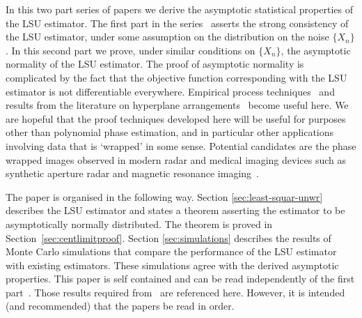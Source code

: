 \documentclass[journal]{IEEEtran}
\begin{document}
In this two part series of papers we derive the asymptotic statistical properties of the LSU estimator.  The first part in the series~\cite{McKilliam_pps1_2012} asserts the strong consistency of the LSU estimator, under some assumption on the distribution on the noise $\{X_n\}$.  In this second part we prove, under similar conditions on $\{X_n\}$, the asymptotic normality of the LSU estimator.  The proof of asymptotic normality is complicated by the fact that the objective function corresponding with the LSU estimator is not differentiable everywhere.  Empirical process techniques~\cite{Pollard_new_ways_clts_1986,Pollard_asymp_empi_proc_1989,van2009empirical,Dudley_unif_central_lim_th_1999} and results from the literature on hyperplane arrangements~\cite{Chazelle_discrepency_method_2000,Matousek_lect_disc_geom_2002} become useful here.  We are hopeful that the proof techniques developed here will be useful for purposes other than polynomial phase estimation, and in particular other applications involving data that is `wrapped' in some sense.  Potential candidates are the phase wrapped images observed in modern radar and medical imaging devices such as synthetic aperture radar and magnetic resonance imaging~\cite{Nico_phaseunwrappingSAR_2000,Friedlander_PD_phaseunwrapping_1996}.

The paper is organised in the following way.  Section \ref{sec:least-squar-unwr} describes the LSU estimator and states a theorem asserting the estimator to be asymptotically normally distributed. The theorem is proved in Section~\ref{sec:centlimitproof}.  Section \ref{sec:simulations} describes the results of Monte Carlo simulations that compare the performance of the LSU estimator with existing estimators.  These simulations agree with the derived asymptotic properties.  This paper is self contained and can be read independently of the first part~\cite{McKilliam_pps1_2012}.  Those results required from~\cite{McKilliam_pps1_2012} are referenced here.  However, it is intended (and recommended) that the papers be read in order.

\end{document}
